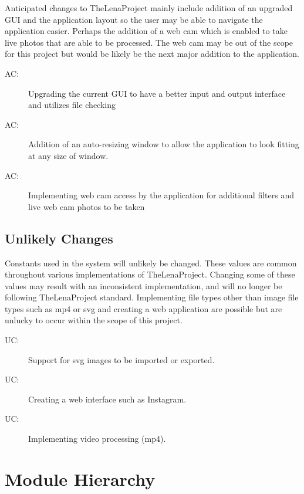 \documentclass[12pt, titlepage]{article}
\newcounter{acnum}
\newcommand{\actheacnum}{AC\theacnum}
\newcounter{ucnum}
\newcommand{\uctheucnum}{UC\theucnum}
\begin{document}
Anticipated changes to TheLenaProject mainly include addition of an upgraded GUI and the application layout so the user may be able to navigate the application easier. Perhaps the addition of a web cam which is enabled to take live photos that are able to be processed. The web cam may be out of the scope for this project but would be likely be the next major addition to the application.

\begin{description}
\item[ \actheacnum \label{acHardware}:] Upgrading the current GUI to have a better input and output interface and utilizes file checking
\item[ \actheacnum \label{acInput}:] Addition of an auto-resizing window to allow the application to look fitting at any size of window.
\item[ \actheacnum \label{acInput}:] Implementing web cam access by the application for additional filters and live web cam photos to be taken
\end{description}

\subsection{Unlikely Changes} \label{SecUchange}

Constants used in the system will unlikely be changed. These values are common throughout
various implementations of TheLenaProject. Changing some of these values may result with an
inconsistent implementation, and will no longer be following TheLenaProject standard. Implementing file types other than image file types such as mp4 or svg and creating a web application are possible but are unlucky to occur within the scope of this project.
\\

\begin{description}
\item[ \uctheucnum \label{ucIO}:] Support for svg images to be imported or exported.
\item[ \uctheucnum \label{ucInput}:] Creating a web interface such as Instagram.
\item[ \uctheucnum \label{ucInput}:] Implementing video processing (mp4).
\end{description}

\section{Module Hierarchy} \label{SecMH}
\end{document}
